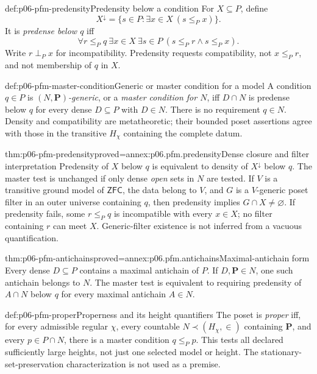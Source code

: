 \begin{hbdefinition}{def:p06-pfm-predensity}{Predensity below a condition}
For \(X\subseteq P\), define
\[
 X^\downarrow=\{s\in P:\exists x\in X\ (s\leq_P x)\}.
\]
It is \emph{predense below \(q\)} iff
\[
 \forall r\leq_P q\ \exists x\in X\ \exists s\in P\
                        (s\leq_P r\land s\leq_P x).
\]
Write \(r\perp_P x\) for incompatibility. Predensity requests compatibility,
not \(x\leq_P r\), and not membership of \(q\) in \(X\).
\end{hbdefinition}

\begin{hbdefinition}{def:p06-pfm-master-condition}{Generic or master condition for a model}
A condition \(q\in P\) is \emph{\((N,\mathbf P)\)-generic}, or a
\emph{master condition for \(N\)}, iff \(D\cap N\) is predense below \(q\)
for every dense \(D\subseteq P\) with \(D\in N\).
There is no requirement \(q\in N\).
Density and compatibility are metatheoretic; their bounded poset assertions
agree with those in the transitive \(H_\chi\) containing the complete datum.
\end{hbdefinition}

\begin{hblemma}{thm:p06-pfm-predensity}{proved=annex:p06.pfm.predensity}{Dense closure and filter interpretation}
Predensity of \(X\) below \(q\) is equivalent to density of
\(X^\downarrow\) below \(q\). The master test is unchanged if only dense
\emph{open} sets in \(N\) are tested.
If \(V\) is a transitive ground model of \(\mathsf{ZFC}\), the data belong
to \(V\), and \(G\) is a \(V\)-generic poset filter in an outer universe
containing \(q\), then predensity implies \(G\cap X\ne\varnothing\).
If predensity fails, some \(r\leq_P q\) is incompatible with every \(x\in X\);
no filter containing \(r\) can meet \(X\).
Generic-filter existence is not inferred from a vacuous quantification.
\end{hblemma}

\begin{hblemma}{thm:p06-pfm-antichains}{proved=annex:p06.pfm.antichains}{Maximal-antichain form}
Every dense \(D\subseteq P\) contains a maximal antichain of \(P\).
If \(D,\mathbf P\in N\), one such antichain belongs to \(N\).
The master test is equivalent to requiring predensity of \(A\cap N\)
below \(q\) for every maximal antichain \(A\in N\).
\end{hblemma}

\begin{hbdefinition}{def:p06-pfm-proper}{Properness and its height quantifiers}
The poset is \emph{proper} iff, for every admissible regular \(\chi\),
every countable \(N\prec(H_\chi,\in)\) containing \(\mathbf P\), and every
\(p\in P\cap N\), there is a master condition \(q\leq_P p\).
This tests all declared sufficiently large heights, not just one selected
model or height. The stationary-set-preservation characterization is not
used as a premise.
\end{hbdefinition}

